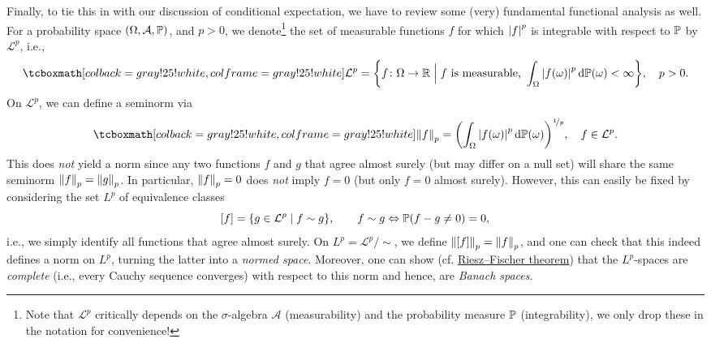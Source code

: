 Finally, to tie this in with our discussion of conditional expectation, we have to review some (very) fundamental functional analysis as well. For a probability space $(\Omega, \mathcal{A}, \P)$, and $p > 0$, we denote\footnote{Note that $\mathcal{L}^p$ critically depends on the $\sigma$-algebra $\mathcal{A}$ (measurability) and the probability measure $\P$ (integrability), we only drop these in the notation for convenience!} the set of measurable functions $f$ for which $\abs{f}^p$ is integrable with respect to $\P$ by $\mathcal{L}^p$, i.e.,
\[
    \highlightMath{
        \mathcal{L}^p = \set{f \colon \Omega \to \R \with[\Big] f \text{ is measurable, } \int_{\Omega} \abs{f(\omega)}^p \dP(\omega) < \infty}, \quad p > 0.
    }
\]
On $\mathcal{L}^p$, we can define a seminorm via
\[
    \highlightMath{
        \norm{f}_p = \left( \int_{\Omega} \abs{f(\omega)}^p \dP(\omega) \right)^{\nicefrac{1}{p}}, \quad f \in \mathcal{L}^p.
    }
\]
This does \emph{not} yield a  norm since any two functions $f$ and $g$ that agree almost surely (but may differ on a null set) will share the same seminorm $\norm{f}_p = \norm{g}_p$. In particular, $\norm{f}_p = 0$ does \emph{not} imply $f = 0$ (but only $f = 0$ almost surely). However, this can easily be fixed by considering the set $L^p$ of equivalence classes
\[
    [f] = \set{g \in \mathcal{L}^p \with f \sim g}, \qquad f \sim g \Leftrightarrow \P(f - g \neq 0) = 0,
\]
i.e., we simply identify all functions that agree almost surely. On $L^p = \mathcal{L}^p / {\sim}$, we define $\norm{[f]}_p = \norm{f}_p$, and one can check that this indeed defines a norm on $L^p$, turning the latter into a \emph{normed space}. Moreover, one can show (cf. \href{https://en.wikipedia.org/wiki/Riesz–Fischer_theorem#Completeness_of_Lp,_0_%3C_p_≤_∞}{Riesz–Fischer theorem}) that the $L^p$-spaces are \emph{complete} (i.e., every Cauchy sequence converges) with respect to this norm and hence, are \emph{Banach spaces}.

